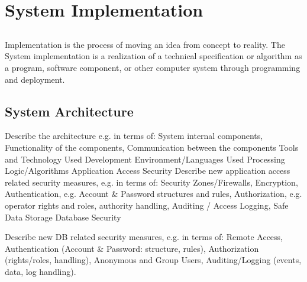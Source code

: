 \chapter{System Implementation} \label{chap:sysImplementation}

\section*{}
Implementation is the process of moving an idea from concept to reality. The System implementation is a realization of a technical specification or algorithm as a program, software component, or other computer system through programming and deployment.

\section{System Architecture}
Describe the architecture e.g. in terms of:  System internal components, Functionality of the components, Communication between the components
Tools and Technology Used
Development Environment/Languages Used
Processing Logic/Algorithms
Application Access Security
Describe new application access related security measures, e.g. in terms of: Security Zones/Firewalls, Encryption, Authentication, e.g. Account \& Password structures and rules, Authorization, e.g. operator rights and roles, authority handling, Auditing / Access Logging, Safe Data Storage
Database Security

Describe new DB related security measures, e.g. in terms of:  Remote Access, Authentication (Account \& Password: structure, rules), Authorization (rights/roles, handling), Anonymous and Group Users, Auditing/Logging (events, data, log handling).

 

